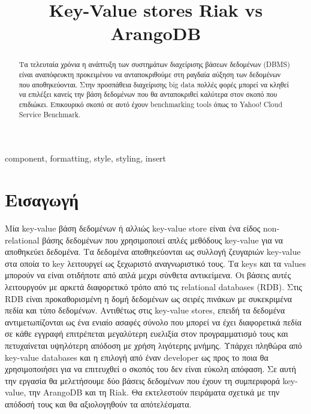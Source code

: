 \documentclass[conference]{IEEEtran}
\begin{document}
\title{Key-Value stores Riak vs ArangoDB \\

}

\author{
\and
{}
\and
{}
}

\maketitle

\begin{abstract}
    Τα τελευταία χρόνια η ανάπτυξη των συστημάτων 
διαχείρισης βάσεων δεδομένων (DBMS) είναι αναπόφευκτη προκειμένου να 
ανταποκριθούμε στη ραγδαία αύξηση των δεδομένων που 
αποθηκεύονται. Στην προσπάθεια διαχείρισης big data 
πολλές φορές μπορεί να κληθεί να επιλέξει κανείς την 
βάση δεδομένων που θα ανταποκριθεί καλύτερα στον σκοπό 
που επιδιώκει. Επικουρικό σκοπό σε αυτό έχουν benchmarking 
tools όπως το Yahoo! Cloud Service Benchmark.

\end{abstract}

\begin{IEEEkeywords}
component, formatting, style, styling, insert
\end{IEEEkeywords}

\section{Εισαγωγή}
Μία key-value βάση δεδομένων ή αλλιώς key-value store είναι ένα είδος non-relational βάσης δεδομένων που 
χρησιμοποιεί απλές μεθόδους key-value για να αποθηκεύει δεδομένα. Τα δεδομένα αποθηκεύονται ως συλλογή ζευγαριών key-value στα 
οποία το key λειτουργεί ως ξεχωριστό αναγνωριστικό τους. Τα keys και τα values μπορούν να είναι οτιδήποτε από απλά μεχρι σύνθετα αντικείμενα. 
Οι βάσεις αυτές λειτουργούν με αρκετά διαφορετικό τρόπο από τις relational databases (RDB). Στις RDB είναι προκαθορισμένη η δομή δεδομένων ως σειρές πινάκων με 
συκεκριμένα πεδία και τύπο δεδομένων. Αντιθέτως στις key-value stores, επειδή τα δεδομένα αντιμετωπίζονται ως ένα ενιαίο ασαφές σύνολο που μπορεί να έχει διαφορετικά πεδία σε κάθε εγγραφή επιτρέπεται μεγαλύτερη ευελιξία στον προγραμματισμό τους και πετυχαίνεται υψηλότερη απόδοση με χρήση λιγότερης μνήμης. Υπάρχει πληθώρα από key-value databases και η επιλογή από έναν developer ως προς το ποια θα χρησιμοποιήσει για να επιτευχθεί ο σκοπός του δεν είναι εύκολη απόφαση. Σε αυτή την εργασία θα μελετήσουμε δύο βάσεις δεδομένων που έχουν τη συμπεριφορά key-value, την ArangoDB και τη Riak. Θα εκτελεστούν πειράματα σχετικά με την απόδοσή τους και θα αξιολογηθούν τα απότελέσματα.
\end{document}
